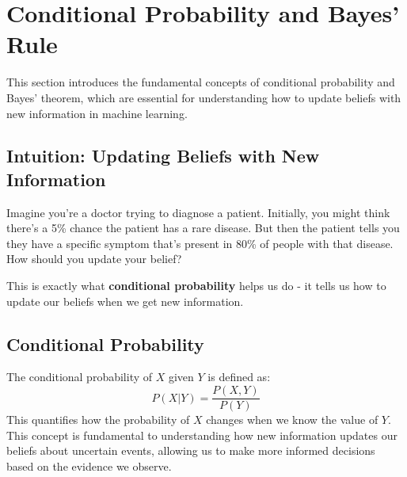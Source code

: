 
\section{Conditional Probability and Bayes' Rule }
\label{sec:conditional-probability}

This section introduces the fundamental concepts of conditional probability and Bayes' theorem, which are essential for understanding how to update beliefs with new information in machine learning.

\subsection{Intuition: Updating Beliefs with New Information}

Imagine you're a doctor trying to diagnose a patient. Initially, you might think there's a 5\% chance the patient has a rare disease. But then the patient tells you they have a specific symptom that's present in 80\% of people with that disease. How should you update your belief?

This is exactly what \textbf{conditional probability} helps us do - it tells us how to update our beliefs when we get new information.

\subsection{Conditional Probability}

The conditional probability of $X$ given $Y$ is defined as:
\begin{equation}
P(X|Y) = \frac{P(X, Y)}{P(Y)}
\end{equation}
This quantifies how the probability of $X$ changes when we know the value of $Y$. This concept is fundamental to understanding how new information updates our beliefs about uncertain events, allowing us to make more informed decisions based on the evidence we observe.

